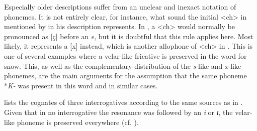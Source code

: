 \documentclass[output=paper,hidelinks]{langscibook}
\begin{document}
Especially older descriptions suffer from an unclear and inexact notation of phonemes. It is not entirely clear, for instance, what sound the initial <ch> in  mentioned by \citet{Jettmar1937} in his  description represents. In , a <ch> would normally be pronounced as [ç] before an \textit{e}, but it is doubtful that this rule applies here. Most likely, it represents a [x] instead, which is another allophone of <ch> in . This is one of several examples where a velar-like fricative is preserved in the word for snow. This, as well as the complementary distribution of the \textit{s}-like and \textit{x}-like phonemes, are the main arguments for the assumption that the same phoneme *\textit{K-} was present in this word and in similar cases.

 lists the  cognates of three interrogatives according to the same sources as in . Given that in no  interrogative the resonance was followed by an \textit{i} or \textit{ɪ}, the velar-like phoneme is preserved everywhere (cf. ).
\end{document}
